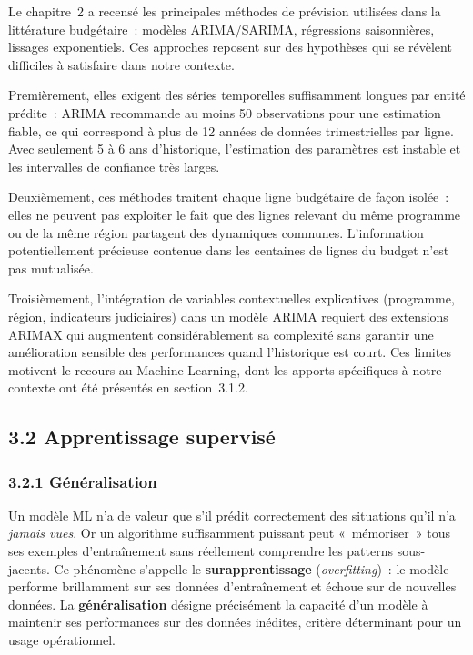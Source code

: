 Le chapitre~2 a recensé les principales méthodes de prévision utilisées dans la
littérature budgétaire~: modèles ARIMA/SARIMA, régressions saisonnières, lissages
exponentiels. Ces approches reposent sur des hypothèses qui se révèlent difficiles
à satisfaire dans notre contexte.

Premièrement, elles exigent des séries temporelles suffisamment longues par entité
prédite~: ARIMA recommande au moins 50 observations pour une estimation fiable, ce
qui correspond à plus de 12 années de données trimestrielles par ligne. Avec
seulement 5 à 6 ans d'historique, l'estimation des paramètres est instable et les
intervalles de confiance très larges.

Deuxièmement, ces méthodes traitent chaque ligne budgétaire de façon isolée~: elles
ne peuvent pas exploiter le fait que des lignes relevant du même programme ou de
la même région partagent des dynamiques communes. L'information potentiellement
précieuse contenue dans les centaines de lignes du budget n'est pas mutualisée.

Troisièmement, l'intégration de variables contextuelles explicatives (programme,
région, indicateurs judiciaires) dans un modèle ARIMA requiert des extensions
ARIMAX qui augmentent considérablement sa complexité sans garantir une amélioration
sensible des performances quand l'historique est court. Ces limites motivent le
recours au Machine Learning, dont les apports spécifiques à notre contexte ont été
présentés en section~3.1.2.

\subsection*{3.2 \quad Apprentissage supervisé}

\subsubsection*{3.2.1 \quad Généralisation}

Un modèle ML n'a de valeur que s'il prédit correctement des situations qu'il n'a
\textit{jamais vues}. Or un algorithme suffisamment puissant peut «~mémoriser~»
tous ses exemples d'entraînement sans réellement comprendre les patterns sous-jacents.
Ce phénomène s'appelle le \textbf{surapprentissage} (\textit{overfitting})~: le
modèle performe brillamment sur ses données d'entraînement et échoue sur de
nouvelles données. La \textbf{généralisation} désigne précisément la capacité d'un
modèle à maintenir ses performances sur des données inédites, critère
déterminant pour un usage opérationnel.

